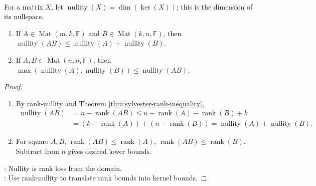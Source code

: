\begin{proposition} \label{prop:sylvester-law-of-nullity} \\
For a matrix $X$, let $\operatorname{nullity}(X)=\dim(\ker(X))$; this is the dimension of its nullspace.
\begin{enumerate}[label=(\roman*)]
\setlength{\itemsep}{0pt}
\item If $A\in\operatorname{Mat}(m,k,\mathbb{F})$ and $B\in\operatorname{Mat}(k,n,\mathbb{F})$, then $\operatorname{nullity}(AB)\leq\operatorname{nullity}(A)+\operatorname{nullity}(B)$.
\item
If $A,B\in\operatorname{Mat}(n,n,\mathbb{F})$, then $\max(\operatorname{nullity}(A),\operatorname{nullity}(B))\leq\operatorname{nullity}(AB)$.
\end{enumerate}
\begin{proof}
\begin{enumerate}[label=(\roman*)]
\setlength{\itemsep}{0pt}
\item
By rank-nullity and Theorem \ref{thm:sylvester-rank-inequality},
\begin{align*}
\operatorname{nullity}(AB) &=n-\operatorname{rank}(AB) \leq n-\operatorname{rank}(A)-\operatorname{rank}(B)+k \\
&=(k-\operatorname{rank}(A))+(n-\operatorname{rank}(B)) =\operatorname{nullity}(A)+\operatorname{nullity}(B).
\end{align*}
\item For square $A,B$, $\operatorname{rank}(AB)\leq\operatorname{rank}(A)$, $\operatorname{rank}(AB)\leq\operatorname{rank}(B)$. Subtract from $n$ gives desired lower bounds.
\end{enumerate}
: Nullity is rank loss from the domain.\\
: Use rank-nullity to translate rank bounds into kernel bounds.
\end{proof}
\end{proposition}


